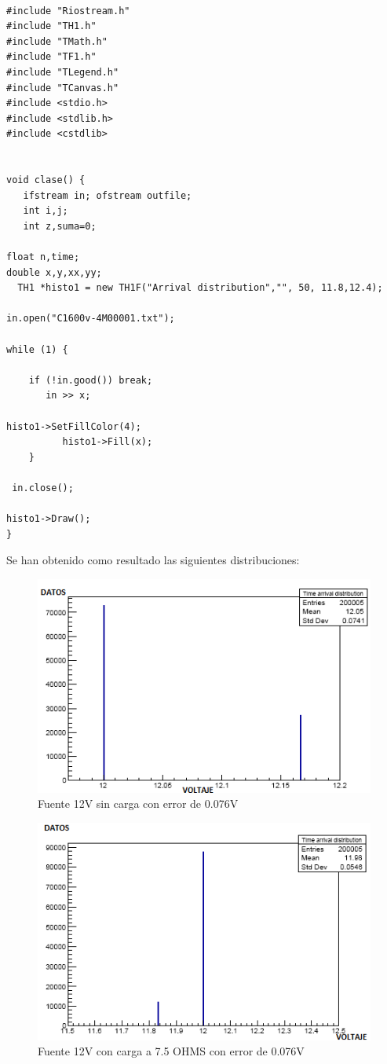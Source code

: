  

\begin{verbatim}

#include "Riostream.h"
#include "TH1.h"
#include "TMath.h"
#include "TF1.h"
#include "TLegend.h"
#include "TCanvas.h"
#include <stdio.h>
#include <stdlib.h>
#include <cstdlib>


void clase() {
   ifstream in; ofstream outfile;
   int i,j;
   int z,suma=0;

float n,time;
double x,y,xx,yy;
  TH1 *histo1 = new TH1F("Arrival distribution","", 50, 11.8,12.4);

in.open("C1600v-4M00001.txt"); 

while (1) {

	if (!in.good()) break;
       in >> x;
       
histo1->SetFillColor(4);
		  histo1->Fill(x);				    
	}
	   
 in.close();	  

histo1->Draw();
}
\end{verbatim}

Se han obtenido como resultado las siguientes distribuciones:

\begin{figure}[H]
\centering
\includegraphics[width=12cm]{Capitulo3/figs/sincarga.png}
\caption{Fuente 12V sin carga con error de 0.076V}
\end{figure}

\begin{figure}[H]
\centering
\includegraphics[width=12cm]{Capitulo3/figs/75ohms.png}
\caption{Fuente 12V con carga a 7.5 OHMS con error de 0.076V}
\end{figure}

